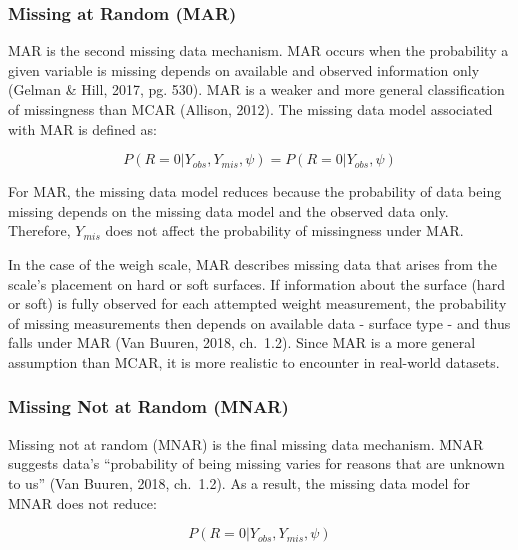 \documentclass[12pt,oneside]{chicagocapstone}
\begin{document}
\subsubsection*{Missing at Random (MAR)}\label{mar}

MAR is the second missing data mechanism. MAR occurs when the
probability a given variable is missing depends on available and
observed information only (Gelman \& Hill, 2017, pg. 530). MAR is a
weaker and more general classification of missingness than MCAR
(Allison, 2012). The missing data model associated with MAR is defined
as:

\[P(R=0|Y_{obs},Y_{mis},\psi) = P(R=0|Y_{obs},\psi)\]

For MAR, the missing data model reduces because the probability of data
being missing depends on the missing data model and the observed data
only. Therefore, \(Y_{mis}\) does not affect the probability of
missingness under MAR.

In the case of the weigh scale, MAR describes missing data that arises
from the scale's placement on hard or soft surfaces. If information
about the surface (hard or soft) is fully observed for each attempted
weight measurement, the probability of missing measurements then depends
on available data - surface type - and thus falls under MAR (Van Buuren,
2018, ch.~1.2). Since MAR is a more general assumption than MCAR, it is
more realistic to encounter in real-world datasets.

\subsubsection*{Missing Not at Random (MNAR)}\label{mnar}

Missing not at random (MNAR) is the final missing data mechanism. MNAR
suggests data's ``probability of being missing varies for reasons that
are unknown to us'' (Van Buuren, 2018, ch.~1.2). As a result, the
missing data model for MNAR does not reduce:

\[P(R=0|Y_{obs},Y_{mis},\psi)\]
\end{document}
